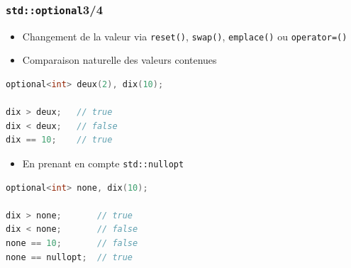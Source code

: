 \documentclass[C++.tex]{subfiles}
\begin{document}
\begin{frame}[fragile]
	\frametitle{\lstinline|std::optional|\titlehfill{}3/4}
	\begin{itemize}
		\item Changement de la valeur via \lstinline|reset()|, \lstinline|swap()|, \lstinline|emplace()| ou \lstinline|operator=()|
		\item Comparaison naturelle des valeurs contenues 
	\end{itemize}

	\begin{lstlisting}[language=C++]
optional<int> deux(2), dix(10);

dix > deux;   // true	
dix < deux;   // false
dix == 10;    // true\end{lstlisting}

	\begin{itemize}
		\item En prenant en compte \lstinline|std::nullopt|
	\end{itemize}

	\begin{lstlisting}[language=C++]
optional<int> none, dix(10);

dix > none;       // true	
dix < none;       // false
none == 10;       // false
none == nullopt;  // true\end{lstlisting}

\end{frame}
\end{document}
